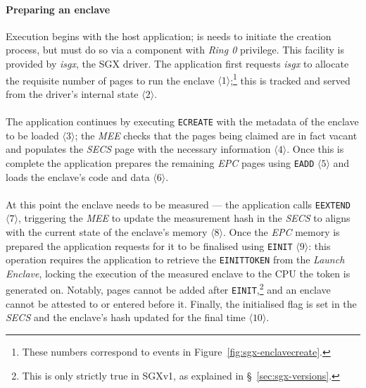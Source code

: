 \paragraph{Preparing an enclave} Execution begins with the host application; is needs to initiate the creation process, but must do so via a component with \textit{Ring 0} privilege. This facility is provided by \textit{isgx}, the SGX driver. The application first requests \textit{isgx} to allocate the requisite number of pages to run the enclave $\langle 1 \rangle$;\footnote{These numbers correspond to events in Figure~\ref{fig:sgx-enclavecreate}.} this is tracked and served from the driver's internal state $\langle 2 \rangle$.

\paragraph{} The application continues by executing \texttt{ECREATE} with the metadata of the enclave to be loaded $\langle 3 \rangle$; the \textit{MEE} checks that the pages being claimed are in fact vacant and populates the \textit{SECS} page with the necessary information $\langle 4 \rangle$. Once this is complete the application prepares the remaining \textit{EPC} pages using \texttt{EADD} $\langle 5 \rangle$ and loads the enclave's code and data $\langle 6 \rangle$.

\paragraph{} At this point the enclave needs to be measured --- the application calls \texttt{EEXTEND} $\langle 7 \rangle$, triggering the \textit{MEE} to update the measurement hash in the \textit{SECS} to aligns with the current state of the enclave's memory $\langle 8 \rangle$. Once the \textit{EPC} memory is prepared the application requests for it to be finalised using \texttt{EINIT} $\langle 9 \rangle$: this operation requires the application to retrieve the \texttt{EINITTOKEN} from the \textit{Launch Enclave}, locking the execution of the measured enclave to the CPU the token is generated on. Notably, pages cannot be added after \texttt{EINIT},\footnote{This is only strictly true in SGXv1, as explained in §~\ref{sec:sgx-versions}.} and an enclave cannot be attested to or entered before it. Finally, the initialised flag is set in the \textit{SECS} and the enclave's hash updated for the final time $\langle 10 \rangle$.



